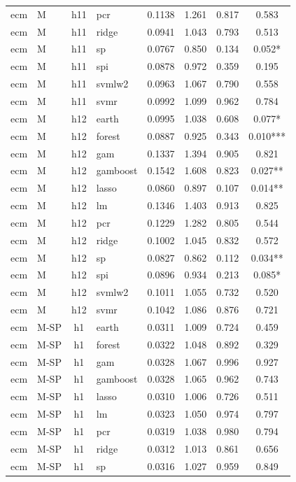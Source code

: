 \begin{ThreePartTable}
\begin{longtable}[t]{llclcccc}
ecm & M & h11 & pcr & 0.1138 & 1.261 & 0.817 & 0.583\\
ecm & M & h11 & ridge & 0.0941 & 1.043 & 0.793 & 0.513\\
ecm & M & h11 & sp & 0.0767 & 0.850 & 0.134 & 0.052*\\
ecm & M & h11 & spi & 0.0878 & 0.972 & 0.359 & 0.195\\
ecm & M & h11 & svmlw2 & 0.0963 & 1.067 & 0.790 & 0.558\\
ecm & M & h11 & svmr & 0.0992 & 1.099 & 0.962 & 0.784\\
\addlinespace
ecm & M & h12 & earth & 0.0995 & 1.038 & 0.608 & 0.077*\\
ecm & M & h12 & forest & 0.0887 & 0.925 & 0.343 & 0.010***\\
ecm & M & h12 & gam & 0.1337 & 1.394 & 0.905 & 0.821\\
ecm & M & h12 & gamboost & 0.1542 & 1.608 & 0.823 & 0.027**\\
ecm & M & h12 & lasso & 0.0860 & 0.897 & 0.107 & 0.014**\\
ecm & M & h12 & lm & 0.1346 & 1.403 & 0.913 & 0.825\\
ecm & M & h12 & pcr & 0.1229 & 1.282 & 0.805 & 0.544\\
ecm & M & h12 & ridge & 0.1002 & 1.045 & 0.832 & 0.572\\
ecm & M & h12 & sp & 0.0827 & 0.862 & 0.112 & 0.034**\\
ecm & M & h12 & spi & 0.0896 & 0.934 & 0.213 & 0.085*\\
ecm & M & h12 & svmlw2 & 0.1011 & 1.055 & 0.732 & 0.520\\
ecm & M & h12 & svmr & 0.1042 & 1.086 & 0.876 & 0.721\\
\addlinespace
ecm & M-SP & h1 & earth & 0.0311 & 1.009 & 0.724 & 0.459\\
ecm & M-SP & h1 & forest & 0.0322 & 1.048 & 0.892 & 0.329\\
ecm & M-SP & h1 & gam & 0.0328 & 1.067 & 0.996 & 0.927\\
ecm & M-SP & h1 & gamboost & 0.0328 & 1.065 & 0.962 & 0.743\\
ecm & M-SP & h1 & lasso & 0.0310 & 1.006 & 0.726 & 0.511\\
ecm & M-SP & h1 & lm & 0.0323 & 1.050 & 0.974 & 0.797\\
ecm & M-SP & h1 & pcr & 0.0319 & 1.038 & 0.980 & 0.794\\
ecm & M-SP & h1 & ridge & 0.0312 & 1.013 & 0.861 & 0.656\\
ecm & M-SP & h1 & sp & 0.0316 & 1.027 & 0.959 & 0.849\\

\end{longtable}
\end{ThreePartTable}
